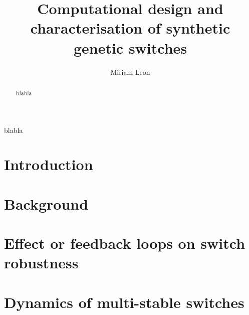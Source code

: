 \documentclass[]{phdthesis}
\title{Computational design and\\[0.2em]characterisation of synthetic\\[0.2em] genetic switches}
\author{Miriam Leon}
\begin{document}
\maketitle


\begin{abstract}
blabla
\end{abstract}

\tableofcontents*
\listoffigures
\listoftables
{}

\printglossary[type=\acronymtype, title=Abbreviations, toctitle=List of abbreviations]


\begin{acknowledgements}
blabla
\end{acknowledgements}


\mainmatter*
\chapter{Introduction}


\mainmatter*
\chapter{Background}
\label{ch:backg}


\mainmatter*
\chapter{Effect or feedback loops on switch robustness }
\label{ch:abcsysbio}



\mainmatter*
 
\chapter{Dynamics of multi-stable switches}
\label{ch:SF}

%
%
%
%
%
\end{document}
